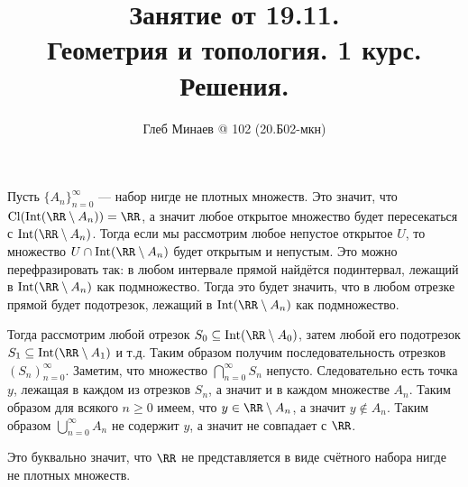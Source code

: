 \documentclass[12pt,a4paper]{article}
\title{Занятие от 19.11.\\Геометрия и топология. 1 курс.\\Решения.}
\author{Глеб Минаев @ 102 (20.Б02-мкн)}
\DeclareMathOperator{\Cl}{Cl}
\DeclareMathOperator{\Int}{Int}
\begin{document}
    \maketitle

    \begin{problem}{30}
        Пусть $\{A_n\}_{n=0}^\infty$ --- набор нигде не плотных множеств. Это значит, что $\Cl(\Int(\RR \setminus A_n)) = \RR$, а значит любое открытое множество будет пересекаться с $\Int(\RR \setminus A_n)$. Тогда если мы рассмотрим любое непустое открытое $U$, то множество $U \cap \Int(\RR \setminus A_n)$ будет открытым и непустым. Это можно перефразировать так: в любом интервале прямой найдётся подинтервал, лежащий в $\Int(\RR \setminus A_n)$ как подмножество. Тогда это будет значить, что в любом отрезке прямой будет подотрезок, лежащий в $\Int(\RR \setminus A_n)$ как подмножество.

        Тогда рассмотрим любой отрезок $S_0 \subseteq \Int(\RR \setminus A_0)$, затем любой его подотрезок $S_1 \subseteq \Int(\RR \setminus A_1)$ и т.д. Таким образом получим последовательность отрезков $(S_n)_{n=0}^\infty$. Заметим, что множество $\bigcap_{n = 0}^\infty S_n$ непусто. Следовательно есть точка $y$, лежащая в каждом из отрезков $S_n$, а значит и в каждом множестве $A_n$. Таким образом для всякого $n \geqslant 0$ имеем, что $y \in \RR \setminus A_n$, а значит $y \notin A_n$. Таким образом $\bigcup_{n = 0}^\infty A_n$ не содержит $y$, а значит не совпадает с $\RR$.

        Это буквально значит, что $\RR$ не представляется в виде счётного набора нигде не плотных множеств.
    \end{problem}
\end{document}

